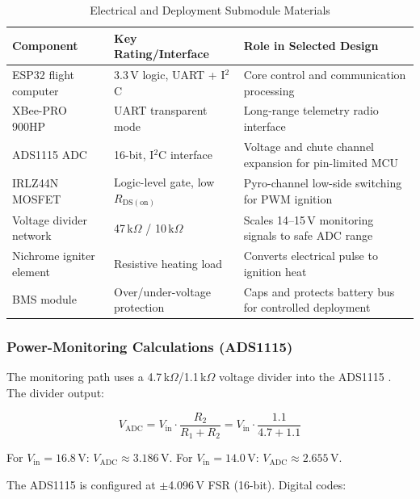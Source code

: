 \begin{table}[!htbp]
  \centering
  \caption{Electrical and Deployment Submodule Materials}
  \label{tab:electrical_materials}
  \small
  \begin{tabular}{@{}p{4cm}|p{3.5cm}|p{5.5cm}@{}}
    \toprule
    \rowcolor{gray!22}\textbf{Component} & \textbf{Key Rating/Interface} & \textbf{Role in Selected Design} \\ \midrule
    ESP32 flight computer & 3.3\,V logic, UART + I$^2$C & Core control and communication processing \\
    XBee-PRO 900HP & UART transparent mode & Long-range telemetry radio interface \\
    ADS1115 ADC & 16-bit, I$^2$C interface & Voltage and chute channel expansion for pin-limited MCU \\
    IRLZ44N MOSFET & Logic-level gate, low $R_\mathrm{DS(on)}$ & Pyro-channel low-side switching for PWM ignition \\
    Voltage divider network & 47\,k$\Omega$ / 10\,k$\Omega$ & Scales 14--15\,V monitoring signals to safe ADC range \\
    Nichrome igniter element & Resistive heating load & Converts electrical pulse to ignition heat \\
    BMS module & Over/under-voltage protection & Caps and protects battery bus for controlled deployment \\ \bottomrule
  \end{tabular}
\end{table}

\subsubsection{Power-Monitoring Calculations (ADS1115)}
\label{sec:ads1115_calc}

The monitoring path uses a 4.7\,k$\Omega$/1.1\,k$\Omega$ voltage divider into
the ADS1115 \cite{ads1115_datasheet}. The divider output:

\begin{equation}
  V_\mathrm{ADC} = V_\mathrm{in} \cdot \frac{R_2}{R_1 + R_2} = V_\mathrm{in} \cdot \frac{1.1}{4.7 + 1.1}
  \label{eq:vadc_divider}
\end{equation}

For $V_\mathrm{in} = 16.8$\,V: $V_\mathrm{ADC} \approx 3.186$\,V.
For $V_\mathrm{in} = 14.0$\,V: $V_\mathrm{ADC} \approx 2.655$\,V.

The ADS1115 is configured at $\pm$4.096\,V FSR (16-bit). Digital codes:

